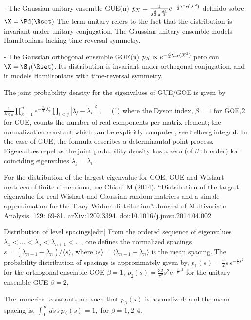 
- The   Gaussian  unitary  ensemble   GUE(n)  $p_X   =  \frac{1}{2^{\frac{d}{2}}
  \pi^{\frac{d^2}{2}}} e^{-\frac12  \Tr(X^2)}$ definido sobre  $\X = \Pd(\Rset)$
  The term unitary  refers to the fact that the  distribution is invariant under
  unitary conjugation. The Gaussian unitary ensemble models Hamiltonians lacking
  time-reversal symmetry.

- The  Gaussian  orthogonal  ensemble   GOE(n)  $p_X  \propto  e^{-  \frac{d}{4}
  \Tr(X^2)}$ pero  con $\X =  \S_d(\Rset)$. Its distribution is  invariant under
  orthogonal  conjugation,   and  it  models   Hamiltonians  with  time-reversal
  symmetry.

The joint probability density for the eigenvalues  of GUE/GOE is given by

$\frac{1}{Z_{\beta, n}} \prod_{k=1}^n e^{-\frac{\beta d}{4}\lambda_k^2}\prod_{i<j}\left|\lambda_j-\lambda_i\right|^\beta~, \quad$ (1)
where the Dyson index, $\beta = 1$ for GOE,2 for GUE,
 counts the number of real components per matrix element; the normalization constant which can be explicitly computed, see Selberg integral. In the case of GUE, the formula describes a determinantal point process. Eigenvalues repel as the joint probability density has a zero (of $\beta$ th order) for coinciding eigenvalues $\lambda_j=\lambda_i$.

For the distribution of the largest eigenvalue for GOE, GUE and Wishart matrices of finite dimensions, see
Chiani M (2014). ``Distribution of the largest eigenvalue for real Wishart and Gaussian random matrices and a simple approximation for the Tracy-Widom distribution''. Journal of Multivariate Analysis. 129: 69-81. arXiv:1209.3394. doi:10.1016/j.jmva.2014.04.002


Distribution of level spacings[edit]
From the ordered sequence of eigenvalues $\lambda_1 < \ldots < \lambda_n < \lambda_{n+1} < \ldots$, one defines the normalized spacings $s = (\lambda_{n+1} - \lambda_n)/\langle s \rangle$, where  $\langle s \rangle =\langle  \lambda_{n+1} - \lambda_n \rangle$ is the mean spacing. The probability distribution of spacings is approximately given by, $  p_1(s) = \frac{\pi}{2}s\, \mathrm{e}^{-\frac{\pi}{4} s^2}  $
for the orthogonal ensemble GOE $\beta =1$, $p_{2}(s)={\frac  {32}{\pi ^{2}}}s^{2}{\mathrm  {e}}^{{-{\frac  {4}{\pi }}s^{2}}}$
for the unitary ensemble GUE  $\beta =2$, 

The numerical constants are such that $ p_\beta(s)$  is normalized:
and the mean spacing is, $ \int_0^\infty ds\, s\, p_\beta(s) = 1, $
for $ \beta = 1,2,4$.


